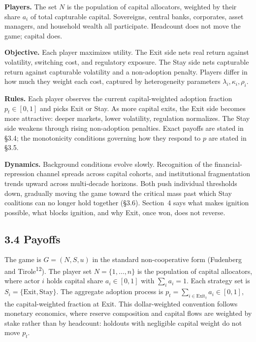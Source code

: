 \documentclass[12pt]{article}
\theoremstyle{definition}
\theoremstyle{remark}
\begin{document}
\smallskip
\noindent\textbf{Players.} The set $N$ is the population of
capital allocators, weighted by their share $a_i$ of total
capturable capital. Sovereigns, central banks, corporates, asset
managers, and household wealth all participate. Headcount does
not move the game; capital does.

\smallskip
\noindent\textbf{Objective.} Each player maximizes utility. The
Exit side nets real return against volatility, switching cost,
and regulatory exposure. The Stay side nets capturable return
against capturable volatility and a non-adoption penalty. Players
differ in how much they weight each cost, captured by
heterogeneity parameters $\lambda_i, \kappa_i, \rho_i$.

\smallskip
\noindent\textbf{Rules.} Each player observes the current
capital-weighted adoption fraction $p_t \in [0, 1]$ and picks
Exit or Stay. As more capital exits, the
Exit side becomes more attractive: deeper markets, lower
volatility, regulation normalizes. The Stay side weakens through
rising non-adoption penalties. Exact payoffs are stated
in \S3.4; the monotonicity conditions governing how they respond
to $p$ are stated in \S3.5.

\smallskip
\noindent\textbf{Dynamics.} Background conditions evolve slowly.
Recognition of the financial-repression channel spreads across capital cohorts, and
institutional fragmentation trends upward across multi-decade horizons.
Both push individual thresholds down, gradually moving the game
toward the critical mass past which Stay coalitions can no longer hold together
(\S3.6). Section~4 says what makes ignition possible, what blocks ignition,
and why Exit, once won, does not reverse.

\subsection{3.4 Payoffs}

The game is $G = (N, S, u)$ in the standard non-cooperative form (Fudenberg and Tirole\textsuperscript{12}). The player set $N = \{1, \ldots, n\}$ is the population of capital allocators, where actor $i$ holds capital share $a_i \in [0,1]$ with $\sum_i a_i = 1$. Each strategy set is $S_i = \{\text{Exit}, \text{Stay}\}$. The aggregate adoption process is $p_t = \sum_{i \in \text{Exit}_t} a_i \in [0,1]$, the capital-weighted fraction at Exit. This dollar-weighted convention follows monetary economics, where reserve composition and capital flows are weighted by stake rather than by headcount: holdouts with negligible capital weight do not move $p_t$.
\end{document}
